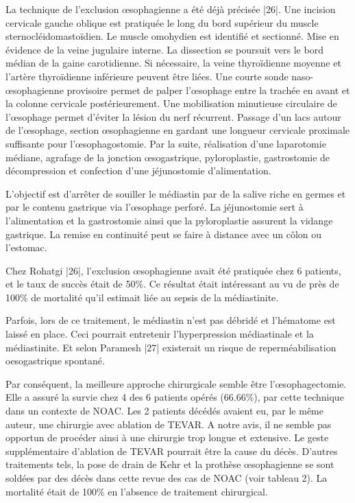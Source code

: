 \documentclass[./tfe.tex]{subfiles}
\begin{document}
La technique de l’exclusion œsophagienne a été déjà précisée |26|. Une incision cervicale gauche oblique est pratiquée le long du bord supérieur du muscle sternocléidomastoïdien. Le muscle omohydien est identifié et sectionné. Mise en évidence de la veine jugulaire interne. La dissection se poursuit vers le bord médian de la gaine carotidienne. Si nécessaire, la veine thyroïdienne moyenne et l’artère thyroïdienne inférieure peuvent être liées. Une courte sonde naso-œsophagienne provisoire permet de palper l’œsophage entre la trachée en avant et la colonne cervicale postérieurement. Une mobilisation minutieuse circulaire de l’œsophage permet d’éviter la lésion du nerf récurrent. Passage d’un lacs autour de l’œsophage, section œsophagienne en gardant une longueur cervicale proximale suffisante pour l’œsophagostomie. Par la suite, réalisation d’une laparotomie médiane, agrafage de la jonction œsogastrique, pyloroplastie, gastrostomie de décompression et confection d’une jéjunostomie d’alimentation.

L’objectif est d’arrêter de souiller le médiastin par de la salive riche en germes et par le contenu gastrique via l’œsophage perforé. La jéjunostomie sert à l’alimentation et la gastrostomie ainsi que la pyloroplastie assurent la vidange gastrique. La remise en continuité peut se faire à distance avec un côlon ou l’estomac.

Chez Rohatgi |26|, l’exclusion œsophagienne avait été pratiquée chez 6 patients, et le taux de succès était de 50\%. Ce résultat était intéressant au vu de près de 100\% de mortalité qu’il estimait liée au sepsis de la médiastinite.

Parfois, lors de ce traitement, le médiastin n’est pas débridé et l’hématome est laissé en place. Ceci pourrait entretenir l’hyperpression médiastinale et la médiastinite. Et selon Paramesh |27| existerait un risque de reperméabilisation oesogastrique spontané.

Par conséquent, la meilleure approche chirurgicale semble être l’œsophagectomie. Elle a assuré la survie chez 4 des 6 patients opérés (66.66\%), par cette technique dans un contexte de NOAC. Les 2 patients décédés avaient eu, par le même auteur, une chirurgie avec ablation de TEVAR. A notre avis, il ne semble pas opportun de procéder ainsi à une chirurgie trop longue et extensive. Le geste supplémentaire d’ablation de TEVAR pourrait être la cause du décès.
D’autres traitements tels, la pose de drain de Kehr et la prothèse œsophagienne se sont soldées par des décès dans cette revue des cas de NOAC (voir tableau 2). La mortalité était de 100\% en l’absence de traitement chirurgical.
\end{document}
